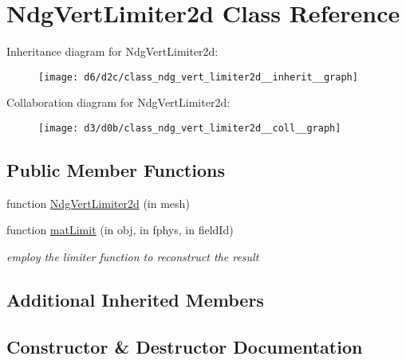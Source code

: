 \hypertarget{class_ndg_vert_limiter2d}{}\section{Ndg\+Vert\+Limiter2d Class Reference}
\label{class_ndg_vert_limiter2d}


Inheritance diagram for Ndg\+Vert\+Limiter2d\+:
\nopagebreak
\begin{figure}[H]
\begin{center}
\leavevmode
\texttt{[image: d6/d2c/class\_ndg\_vert\_limiter2d\_\_inherit\_\_graph]}
\end{center}
\end{figure}


Collaboration diagram for Ndg\+Vert\+Limiter2d\+:
\nopagebreak
\begin{figure}[H]
\begin{center}
\leavevmode
\texttt{[image: d3/d0b/class\_ndg\_vert\_limiter2d\_\_coll\_\_graph]}
\end{center}
\end{figure}
\subsection*{Public Member Functions}
\begin{DoxyCompactItemize}
\item 
function \hyperlink{class_ndg_vert_limiter2d_a6eaf0f1f58c0c6955748ba132f1ed690}{Ndg\+Vert\+Limiter2d} (in mesh)
\item 
function \hyperlink{class_ndg_vert_limiter2d_a26be61b8865340e1480ace3abb582d73}{mat\+Limit} (in obj, in fphys, in field\+Id)
\begin{DoxyCompactList}\small\item\em employ the limiter function to reconstruct the result \end{DoxyCompactList}\end{DoxyCompactItemize}
\subsection*{Additional Inherited Members}


\subsection{Constructor \& Destructor Documentation}
\mbox{\label{class_ndg_vert_limiter2d_a6eaf0f1f58c0c6955748ba132f1ed690}} 

